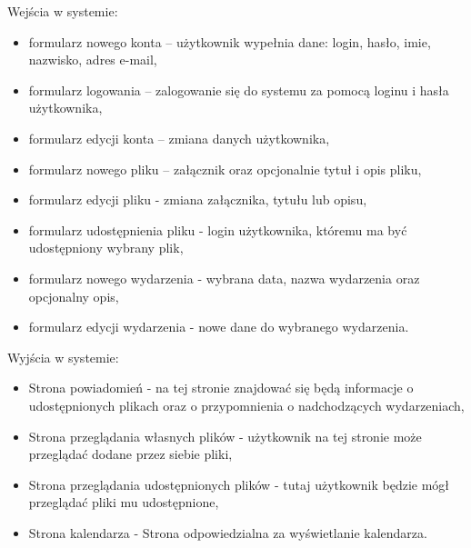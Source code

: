 Wejścia w systemie:
\begin{itemize}
	\item formularz nowego konta – użytkownik wypełnia dane: login, hasło, imie, nazwisko, adres e-mail,
	\item formularz logowania – zalogowanie się do systemu za pomocą loginu i hasła użytkownika,
	\item formularz edycji konta – zmiana danych użytkownika,
	\item formularz nowego pliku – załącznik oraz opcjonalnie tytuł i opis pliku,
	\item formularz edycji pliku - zmiana załącznika, tytułu lub opisu,
	\item formularz udostępnienia pliku - login użytkownika, któremu ma być udostępniony wybrany plik,
	\item formularz nowego wydarzenia - wybrana data, nazwa wydarzenia oraz opcjonalny opis,
	\item formularz edycji wydarzenia - nowe dane do wybranego wydarzenia.
\end{itemize}
Wyjścia w systemie:
\begin{itemize}
	\item Strona powiadomień - na tej stronie znajdować się będą informacje o udostępnionych plikach oraz o przypomnienia o nadchodzących wydarzeniach,
	\item Strona przeglądania własnych plików - użytkownik na tej stronie może przeglądać dodane przez siebie pliki,
	\item Strona przeglądania udostępnionych plików - tutaj użytkownik będzie mógł przeglądać pliki mu udostępnione,
	\item Strona kalendarza - Strona odpowiedzialna za wyświetlanie kalendarza.
\end{itemize}
